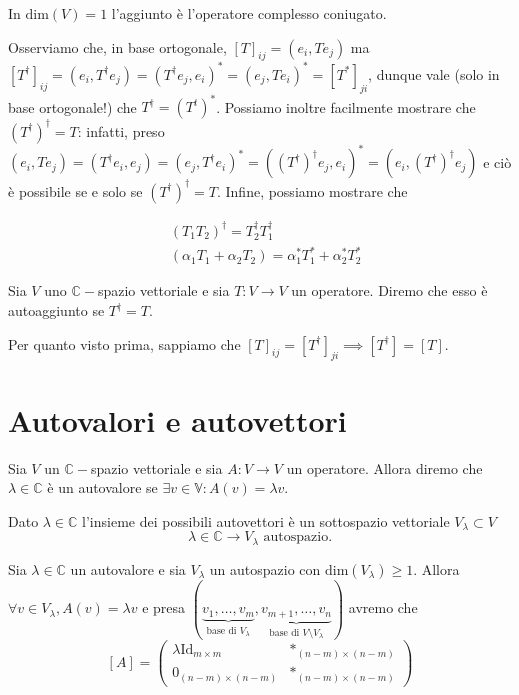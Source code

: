 \documentclass[12pt, twoside, italian, openany]{book}
\begin{document}
	\begin{remark}
		In $\text{dim}(V)=1$ l'aggiunto è l'operatore complesso coniugato.
	\end{remark}
	Osserviamo che, in base ortogonale, $[T]_{ij} = (e_i, Te_j)$ ma $[T^{\dag}]_{ij} = (e_i, T^{\dag}e_j) = (T^{\dag} e_j, e_i)^* = (e_j, T e_i)^{*} = [T^*]_{ji}$, dunque vale (solo in base ortogonale!) che $T^{\dag} = (T^t)^*$. Possiamo inoltre facilmente
	mostrare che $(T^{\dag})^{\dag} = T$: infatti, preso $(e_i, Te_j) = (T^{\dag}e_i, e_j) = (e_j, T^{\dag} e_i)^*=((T^{\dag})^{\dag}e_j, e_i)^* = (e_i, (T^{\dag})^{\dag} e_j)$ e ciò è possibile se e solo se $(T^{\dag})^\dag = T$. Infine, possiamo mostrare che
	\begin{prop}
		\begin{align*}
			&(T_1T_2)^{\dag} = T_2^\dag T_1^\dag \\
			&(\alpha_1 T_1 + \alpha_2 T_2) = \alpha_1^* T_1^* + \alpha_2^* T_2^*
		\end{align*}
	\end{prop}
	\begin{definition}
		Sia $V$ uno $\mathbb{C}-$spazio vettoriale e sia $T: V \to V$ un operatore. Diremo che esso è autoaggiunto se $T^{\dag} = T$.
	\end{definition}
	Per quanto visto prima, sappiamo che $[T]_{ij} = [T^{\dag}]_{ji} \implies [T^{\dag}] = [T]$.
	\section{Autovalori e autovettori}
	
	\begin{definition}
		Sia $V$ un $\mathbb{C}-$spazio vettoriale e sia $A: V \to V$ un operatore. Allora diremo che $\lambda \in \mathbb{C}$ è un autovalore se $\exists v \in \mathbb{V} : A(v) = \lambda v$.
	\end{definition}
	\begin{prop}
		Dato $\lambda \in \mathbb{C}$ l'insieme dei possibili autovettori è un sottospazio vettoriale $V_\lambda \subset V$
		$$
		\lambda \in \mathbb{C} \longrightarrow V_{\lambda} \text{ autospazio}.
		$$
	\end{prop}
	Sia $\lambda \in \mathbb{C}$ un autovalore e sia $V_\lambda$ un autospazio con $\text{dim}(V_{\lambda}) \geq 1$. Allora $\forall v \in V_\lambda, A(v) = \lambda v$ e presa $(\underbrace{v_1, \ldots, v_m}_{\text{base di $V_\lambda$}}, \underbrace{v_{m+1}, \ldots, v_n}_{\text{base di $V \setminus V_\lambda$}})$ avremo che
	$$
		[A] = \begin{pmatrix}
			\lambda \text{Id}_{m \times m} & \ast_{(n-m) \times (n-m)}\\
			0_{(n-m) \times (n-m)} & \ast_{(n-m) \times (n-m)}
		\end{pmatrix}
	$$
\end{document}
